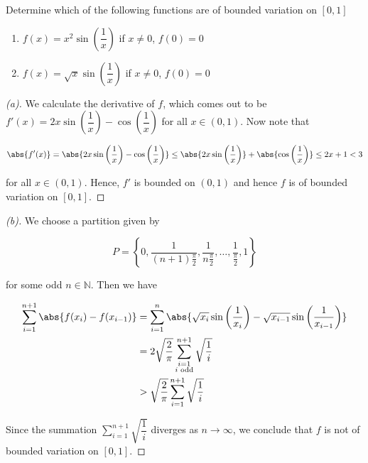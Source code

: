 \documentclass{article}
\begin{document}
\thispagestyle{empty}

\titleBC

\begin{question*}[6.1]
    Determine which of the following functions are of bounded variation on $\left[0, 1\right]$
    \begin{enumerate}[label=(\alph*)]
        \item $f(x) = x^2 \sin \left(\dfrac{1}{x}\right)$ if $x \neq 0$, $f(0) = 0$
        \item $f(x) = \sqrt{x} \sin \left(\dfrac{1}{x}\right)$ if $x \neq 0$, $f(0) = 0$
    \end{enumerate}
\end{question*}

\begin{proof}[(a)]
    We calculate the derivative of $f$, which comes out to be $f'(x) = 2x \sin \left(\dfrac{1}{x}\right) - \cos \left(\dfrac{1}{x}\right)$ for all $x \in \left(0, 1\right)$. Now note that 

    \[
        \abs{f'(x)} = \abs{2x \sin \left(\dfrac{1}{x}\right) - \cos \left(\dfrac{1}{x}\right)} \leq \abs{2x \sin \left(\dfrac{1}{x}\right)} + \abs{\cos \left(\dfrac{1}{x}\right)} \leq 2x + 1 < 3
    \]

    for all $x \in \left(0, 1\right)$. Hence, $f'$ is bounded on $\left(0, 1\right)$ and hence $f$ is of bounded variation on $\left[0, 1\right]$.
\end{proof}

\begin{proof}[(b)]
    We choose a partition given by 

    \[
        P = \left\{ 0, \dfrac{1}{(n+1)\frac{\pi}{2}}, \dfrac{1}{n\frac{\pi}{2}}, \ldots, \dfrac{1}{\frac{\pi}{2}}, 1 \right\}
    \]

    for some odd $n \in \mathbb{N}$. Then we have 

    \begin{align*}
        \sum_{i=1}^{n+1} \abs{f(x_i) - f(x_{i-1})} &= \sum_{i=1}^{n} \abs{\sqrt{x_i} \sin \left(\dfrac{1}{x_i}\right) - \sqrt{x_{i-1}} \sin \left(\dfrac{1}{x_{i-1}}\right)} \\
        &= 2 \sqrt{\dfrac{2}{\pi}} \sum_{\substack{i = 1 \\ i \text{ odd}}}^{n+1} \sqrt{\dfrac{1}{i}} \\
        &> \sqrt{\dfrac{2}{\pi}} \sum_{i = 1}^{n+1} \sqrt{\dfrac{1}{i}}
    \end{align*}

    Since the summation $\displaystyle\sum_{i = 1}^{n+1} \sqrt{\dfrac{1}{i}}$ diverges as $n \to \infty$, we conclude that $f$ is not of bounded variation on $\left[0, 1\right]$.
\end{proof}
\end{document}
